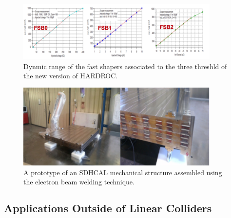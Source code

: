 \begin{figure}
\centering
\includegraphics[width=0.90\textwidth]{Calorimeter/SDHCAL_GRPC/figures/fsb.png}
\caption{Dynmic range of the fast shapers associated to the three threshld of the new version of HARDROC.}\label{fig:Calorimeter:SDHCAL_GRPC:FSB}
\end{figure}

\begin{figure}
\centering
\includegraphics[width=0.90\textwidth]{Calorimeter/SDHCAL_GRPC/figures/EBW.png}
\caption{A prototype of an SDHCAL mechanical structure assembled using the electron beam welding technique.}\label{fig:Calorimeter:SDHCAL_GRPC:EBW}
\end{figure}


\subsection{Applications Outside of Linear Colliders}
